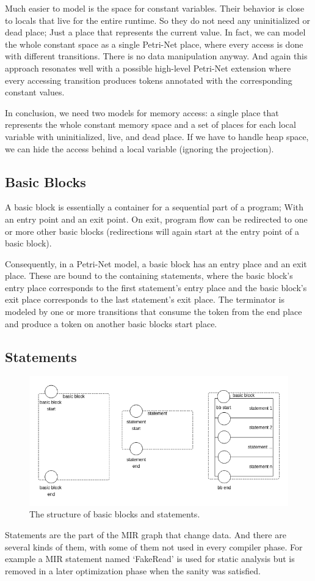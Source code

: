 Much easier to model is the space for constant variables.
Their behavior is close to locals that live for the entire runtime.
So they do not need any uninitialized or dead place; 
Just a place that represents the current value.
In fact, we can model the whole constant space as a single Petri-Net place, where every access is done with different transitions.
There is no data manipulation anyway.
And again this approach resonates well with a possible high-level Petri-Net extension where every accessing transition produces tokens annotated with the corresponding constant values.

In conclusion, we need two models for memory access: a single place that represents the whole constant memory space and a set of places for each local variable with uninitialized, live, and dead place.
If we have to handle heap space, we can hide the access behind a local variable (ignoring the projection).

\subsection{Basic Blocks}
A basic block is essentially a container for a sequential part of a program; 
With an entry point and an exit point.
On exit, program flow can be redirected to one or more other basic blocks (redirections will again start at the entry point of a basic block).

Consequently, in a Petri-Net model, a basic block has an entry place and an exit place.
These are bound to the containing statements, where the basic block's entry place corresponds to the first statement's entry place and the basic block's exit place corresponds to the last statement's exit place.
The terminator is modeled by one or more transitions that consume the token from the end place and produce a token on another basic blocks start place.

\subsection{Statements}
\begin{figure}
    \centering
    \includegraphics[width=.9\textwidth]{../diagrams/basic_blocks.png}
    \caption{
        The structure of basic blocks and statements.
    }
    \label{basic_block_trans}
\end{figure}
Statements are the part of the MIR graph that change data.
And there are several kinds of them, with some of them not used in every compiler phase.
For example a MIR statement named `FakeRead' is used for static analysis but is removed in a later optimization phase when the sanity was satisfied.

